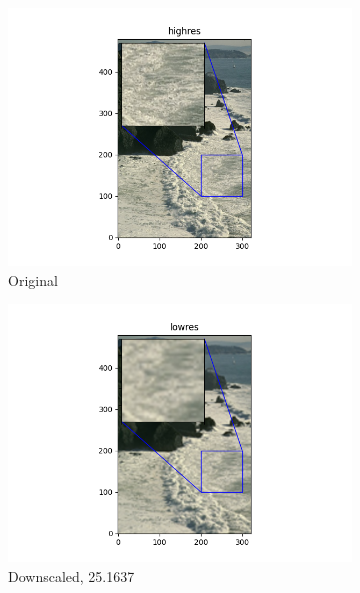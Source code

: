 \documentclass[12pt]{article}
\begin{document}
\begin{figure}[h!]
  \begin{subfigure}[b]{0.32\linewidth}
    \includegraphics[width=\linewidth]{./4-highres.png}
    \caption{Original}
  \end{subfigure}
  \hfill
  \begin{subfigure}[b]{0.32\linewidth}
    \includegraphics[width=\linewidth]{./4-lowres.png}
    \caption{Downscaled, 25.1637}
  \end{subfigure}
  \hfill
  \begin{subfigure}[b]{0.32\linewidth}

\end{subfigure}
\end{figure}
\end{document}
